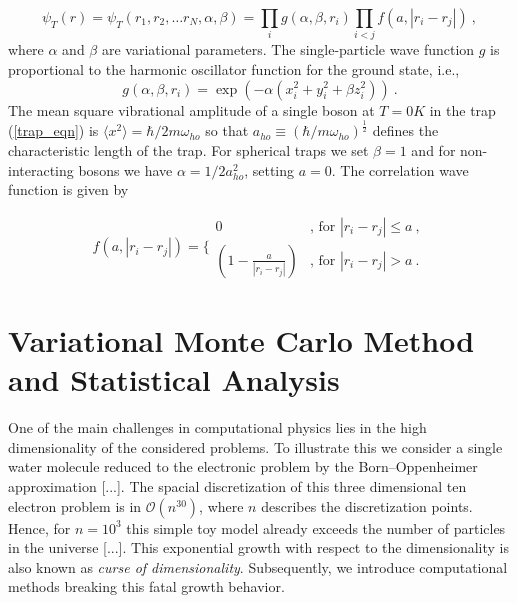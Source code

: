 \documentclass[11pt,a4paper]{article}
\numberwithin{equation}{section}
\begin{document}
\begin{equation}
\psi_T({r})=\psi_T({r}_1, {r}_2, \dots {r}_N,\alpha,\beta)=\prod_i g(\alpha,\beta,{r}_i)\prod_{i<j}f(a,|{r}_i-{r}_j|)~,
\label{eq:trialwf}
\end{equation}
where $\alpha$ and $\beta$ are variational parameters. 
%
The single-particle wave function $g$ is proportional to the harmonic oscillator function for the ground state, i.e.,
\begin{equation}
g(\alpha,\beta,{r}_i)= \exp(-\alpha(x_i^2+y_i^2+\beta z_i^2))~.
\end{equation}
The mean square vibrational amplitude of a single boson at $T=0K$ in the trap (\ref{trap_eqn}) is $\langle x^2\rangle=\hbar/2m\omega_{ho}$ so that $a_{ho} \equiv (\hbar/m\omega_{ho})^{\frac{1}{2}}$ defines the characteristic length of the trap.  
%
For spherical traps we set $\beta = 1$ and for non-interacting bosons we have $\alpha = 1/2a_{ho}^2$, setting $a = 0$.
%
%
The correlation wave function is given by

\begin{equation}
f(a,|{r}_i-{r}_j|)=\Bigg\{
\begin{array}{ll}
0 & \text{, for }{|{r}_i-{r}_j|} \leq {a}~,\\
(1-\frac{a}{|{r}_i-{r}_j|}) & \text{, for }{|{r}_i-{r}_j|} > {a}~.
\end{array}
\end{equation}




\section{Variational Monte Carlo Method and Statistical Analysis}
%
%
%
One of the main challenges in computational physics lies in the high dimensionality of the considered problems. 
%
To illustrate this we consider a single water molecule reduced to the electronic problem by the Born--Oppenheimer approximation [...].
%
The spacial discretization of this three dimensional ten electron problem is in $\mathcal{O}(n^{30})$, where $n$ describes the discretization points. 
%
Hence, for $n=10^3$ this simple toy model already exceeds the number of particles in the universe [...]. 
%
This exponential growth with respect to the dimensionality is also known as \textit{curse of dimensionality}. 
%
Subsequently, we introduce computational methods breaking this fatal growth behavior. 
\end{document}
